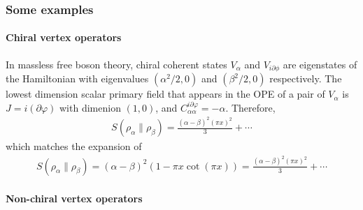 \documentclass[11pt]{article}
\newcommand{\p}{\partial}
\begin{document}
\subsubsection{Some examples}
  \paragraph{Chiral vertex operators}

  In massless free boson theory, chiral coherent states $V_\alpha$ and $V_{i\partial\phi}$ are eigenstates of the Hamiltonian with eigenvalues $(\alpha^2/2,0)$ and $(\beta^2/2,0)$ respectively. The lowest dimension scalar primary field that appears in the OPE of a pair of $V_\alpha$ is $J=i(\p\varphi)$ with dimenion $(1,0)$, and $C^{i\p\varphi}_{\alpha\alpha}=-\alpha$. Therefore,
  \begin{align}
    S(\rho_\alpha\|\rho_\beta)=\frac{(\alpha-\beta)^2(\pi x)^2}{3}+\cdots
  \end{align}
  which matches the expansion of 
  \begin{align}
    S(\rho_\alpha\|\rho_\beta)=(\alpha-\beta)^2(1-\pi x\cot(\pi x))=\frac{(\alpha-\beta)^2(\pi x)^2}{3}+\cdots
  \end{align}

  \paragraph{Non-chiral vertex operators}
\end{document}
